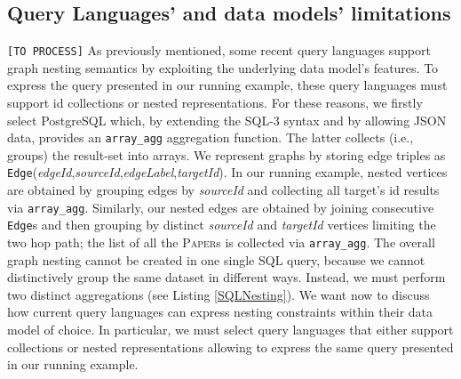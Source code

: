 \subsection{Query Languages' and data models' limitations}\label{subsec:pathsumm}
\texttt{\color{red}[TO PROCESS]}
As previously mentioned, some recent  query languages support graph nesting semantics by exploiting the underlying data model's features. To express the query presented in our running example, these query languages must support id collections or nested representations.
For these reasons, we firstly select PostgreSQL which, by extending the SQL-3 syntax and by allowing JSON data, provides an \texttt{array\_agg} aggregation function. The latter collects (i.e., groups) the result-set into arrays.  We  represent  graphs by  storing edge triples as \texttt{Edge}(\textit{edgeId},\;\textit{sourceId},\;\textit{edgeLabel},\;\textit{targetId}).
In our running example, nested vertices  are obtained by 
grouping edges by \textit{sourceId} and collecting all target's id results via \texttt{array\_agg}. Similarly, our nested edges are obtained by joining consecutive \texttt{Edge}s and then grouping  by  distinct \textit{sourceId} and \textit{targetId}  vertices limiting the two hop path; the list of all the \textsc{Paper}s is collected via \texttt{array\_agg}. The overall graph nesting cannot be created in one single SQL query, because we cannot distinctively group the same dataset in different ways. Instead, we must perform two distinct aggregations (see Listing \ref{SQLNesting}).
We want now to discuss how current query languages can express nesting constraints within their data model of choice. In particular, we must select query languages that either support collections or nested representations allowing to express the same query presented in our running example. 


